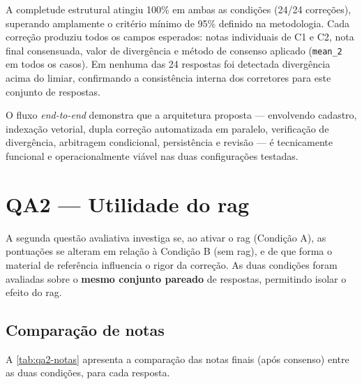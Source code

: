 A completude estrutural atingiu 100\% em ambas as condições (24/24 correções), superando amplamente o critério mínimo de 95\% definido na metodologia. Cada correção produziu todos os campos esperados: notas individuais de C1 e C2, nota final consensuada, valor de divergência e método de consenso aplicado (\texttt{mean\_2} em todos os casos). Em nenhuma das 24 respostas foi detectada divergência acima do limiar, confirmando a consistência interna dos corretores para este conjunto de respostas.

O fluxo \textit{end-to-end} demonstra que a arquitetura proposta --- envolvendo cadastro, indexação vetorial, dupla correção automatizada em paralelo, verificação de divergência, arbitragem condicional, persistência e revisão --- é tecnicamente funcional e operacionalmente viável nas duas configurações testadas.


\section{QA2 --- Utilidade do \texorpdfstring{\gls{rag}}{RAG}}
\label{sec:qa2}

A segunda questão avaliativa investiga se, ao ativar o \gls{rag} (Condição A), as pontuações se alteram em relação à Condição B (sem \gls{rag}), e de que forma o material de referência influencia o rigor da correção. As duas condições foram avaliadas sobre o \textbf{mesmo conjunto pareado} de respostas, permitindo isolar o efeito do \gls{rag}.

\subsection{Comparação de notas}

A \autoref{tab:qa2-notas} apresenta a comparação das notas finais (após consenso) entre as duas condições, para cada resposta.

